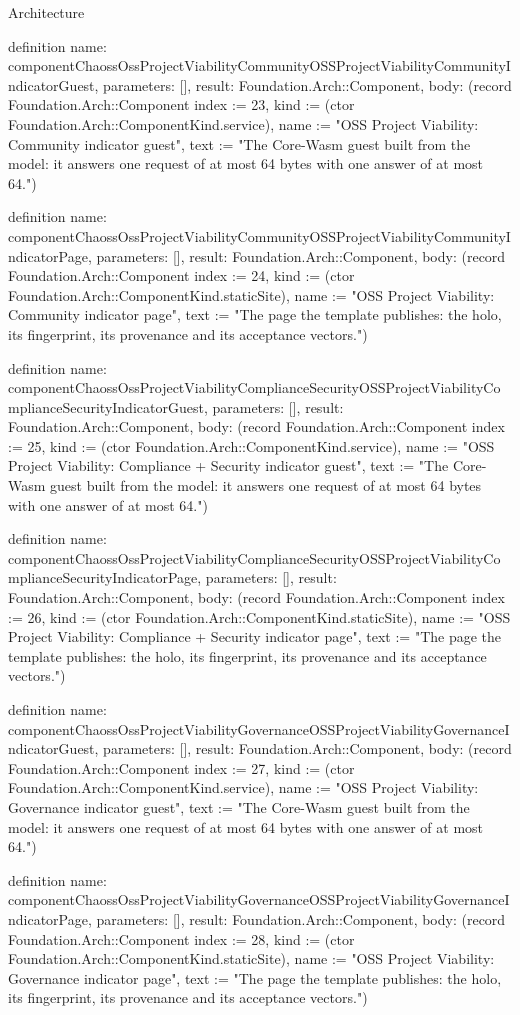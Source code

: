 \begin{lexlean}{Architecture}
\begin{semanticmodule}
definition{
  name: componentChaossOssProjectViabilityCommunityOSSProjectViabilityCommunityIndicatorGuest,
  parameters: [],
  result: Foundation.Arch::Component,
  body: (record Foundation.Arch::Component {index := 23, kind := (ctor Foundation.Arch::ComponentKind.service), name := "OSS Project Viability: Community indicator guest", text := "The Core-Wasm guest built from the model: it answers one request of at most 64 bytes with one answer of at most 64."})
}

definition{
  name: componentChaossOssProjectViabilityCommunityOSSProjectViabilityCommunityIndicatorPage,
  parameters: [],
  result: Foundation.Arch::Component,
  body: (record Foundation.Arch::Component {index := 24, kind := (ctor Foundation.Arch::ComponentKind.staticSite), name := "OSS Project Viability: Community indicator page", text := "The page the template publishes: the holo, its fingerprint, its provenance and its acceptance vectors."})
}

definition{
  name: componentChaossOssProjectViabilityComplianceSecurityOSSProjectViabilityComplianceSecurityIndicatorGuest,
  parameters: [],
  result: Foundation.Arch::Component,
  body: (record Foundation.Arch::Component {index := 25, kind := (ctor Foundation.Arch::ComponentKind.service), name := "OSS Project Viability: Compliance + Security indicator guest", text := "The Core-Wasm guest built from the model: it answers one request of at most 64 bytes with one answer of at most 64."})
}

definition{
  name: componentChaossOssProjectViabilityComplianceSecurityOSSProjectViabilityComplianceSecurityIndicatorPage,
  parameters: [],
  result: Foundation.Arch::Component,
  body: (record Foundation.Arch::Component {index := 26, kind := (ctor Foundation.Arch::ComponentKind.staticSite), name := "OSS Project Viability: Compliance + Security indicator page", text := "The page the template publishes: the holo, its fingerprint, its provenance and its acceptance vectors."})
}

definition{
  name: componentChaossOssProjectViabilityGovernanceOSSProjectViabilityGovernanceIndicatorGuest,
  parameters: [],
  result: Foundation.Arch::Component,
  body: (record Foundation.Arch::Component {index := 27, kind := (ctor Foundation.Arch::ComponentKind.service), name := "OSS Project Viability: Governance indicator guest", text := "The Core-Wasm guest built from the model: it answers one request of at most 64 bytes with one answer of at most 64."})
}

definition{
  name: componentChaossOssProjectViabilityGovernanceOSSProjectViabilityGovernanceIndicatorPage,
  parameters: [],
  result: Foundation.Arch::Component,
  body: (record Foundation.Arch::Component {index := 28, kind := (ctor Foundation.Arch::ComponentKind.staticSite), name := "OSS Project Viability: Governance indicator page", text := "The page the template publishes: the holo, its fingerprint, its provenance and its acceptance vectors."})
}


\end{semanticmodule}
\end{lexlean}
